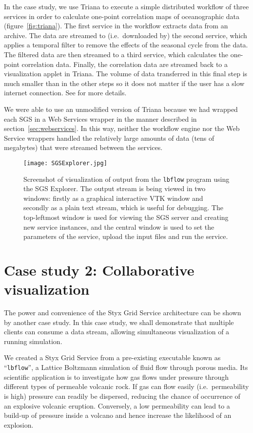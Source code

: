 \documentclass[a4paper]{article}
\begin{document}
\begin{multicols}{2}
In the case study, we use Triana to execute a simple distributed workflow of three services in order to calculate one-point correlation maps of oceanographic data (figure~\ref{fig:triana}).  The first service in the workflow extracts data from an archive.  The data are streamed to (i.e.\ downloaded by) the second service, which applies a temporal filter to remove the effects of the seasonal cycle from the data.  The filtered data are then streamed to a third service, which calculates the one-point correlation data.  Finally, the correlation data are streamed back to a visualization applet in Triana.  The volume of data transferred in this final step is much smaller than in the other steps so it does not matter if the user has a slow internet connection.  See \cite{BlowerPoster:2004} for more details.

We were able to use an unmodified version of Triana because we had wrapped each SGS in a Web Services wrapper in the manner described in section~\ref{sec:webservices}.  In this way, neither the workflow engine nor the Web Service wrappers handled the relatively large amounts of data (tens of megabytes) that were streamed between the services.

\begin{figure*}
\centering
\texttt{[image: SGSExplorer.jpg]}
\caption{Screenshot of visualization of output from the {\tt lbflow} program using the SGS Explorer.  The output stream is being viewed in two windows: firstly as a graphical interactive VTK window and secondly as a plain text stream, which is useful for debugging.  The top-leftmost window is used for viewing the SGS server and creating new service instances, and the central window is used to set the parameters of the service, upload the input files and run the service.} \label{fig:sgsexplorer}
\end{figure*}

\section{Case study 2: Collaborative visualization}\label{sec:collabviz}
The power and convenience of the Styx Grid Service architecture can be shown by another case study.  In this case study, we shall demonstrate that multiple clients can consume a data stream, allowing simultaneous visualization of a running simulation.

We created a Styx Grid Service from a pre-existing executable known as ``\texttt{lbflow}'', a Lattice Boltzmann simulation of fluid flow through porous media.  Its scientific application is to investigate how gas flows under pressure through different types of permeable volcanic rock.  If gas can flow easily (i.e.\ permeability is high) pressure can readily be dispersed, reducing the chance of occurrence of an explosive volcanic eruption.  Conversely, a low permeability can lead to a build-up of pressure inside a volcano and hence increase the likelihood of an explosion.


\end{multicols}
\end{document}
